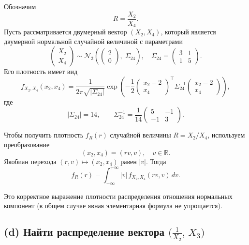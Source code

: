 \documentclass[12pt]{article}
\begin{document}
    Обозначим
    \[
        R = \frac{X_2}{X_4}.
    \]
    Пусть рассматривается двумерный вектор $(X_2,X_4)$, который является двумерной нормальной случайной величиной с параметрами
    \[
        \begin{pmatrix}
            X_2\\ X_4
        \end{pmatrix}
        \sim
        \mathcal{N}_2\!\left(
                           \begin{pmatrix}
                               2\\ 0
                           \end{pmatrix},
                           \;
                           \Sigma_{24}
        \right),
        \quad
        \Sigma_{24}
        =
        \begin{pmatrix}
            3 & 1\\
            1 & 5
        \end{pmatrix}.
    \]
    Его плотность имеет вид
    \[
        f_{X_2,X_4}(x_2,x_4)
        = \frac{1}{2\pi\sqrt{|\Sigma_{24}|}}
        \exp\!\left(
                  -\frac12
                  \begin{pmatrix}
                      x_2-2\\ x_4
                  \end{pmatrix}^{\!\top}
                  \Sigma_{24}^{-1}
                  \begin{pmatrix}
                      x_2-2\\ x_4
                  \end{pmatrix}
        \right),
    \]
    где
    \[
        |\Sigma_{24}| = 14,
        \qquad
        \Sigma_{24}^{-1}
        = \frac{1}{14}
        \begin{pmatrix}
            5 & -1\\
            -1 & 3
        \end{pmatrix}.
    \]

    Чтобы получить плотность $f_R(r)$ случайной величины $R = X_2/X_4$, используем преобразование
    \[
        (x_2,x_4) = (rv, v),\quad v\in\mathbb{R}.
    \]
    Якобиан перехода $(r,v)\mapsto (x_2,x_4)$ равен $|v|$. Тогда
    \[
        f_R(r)
        = \int_{-\infty}^{+\infty} |v|\,
        f_{X_2,X_4}(rv, v)\,dv.
    \]

    Это корректное выражение плотности распределения отношения нормальных компонент (в общем случае явная элементарная формула не упрощается).

    \subsection*{(d) Найти распределение вектора $\bigl(\frac{1}{X_2},\,X_3\bigr)$}
\end{document}
